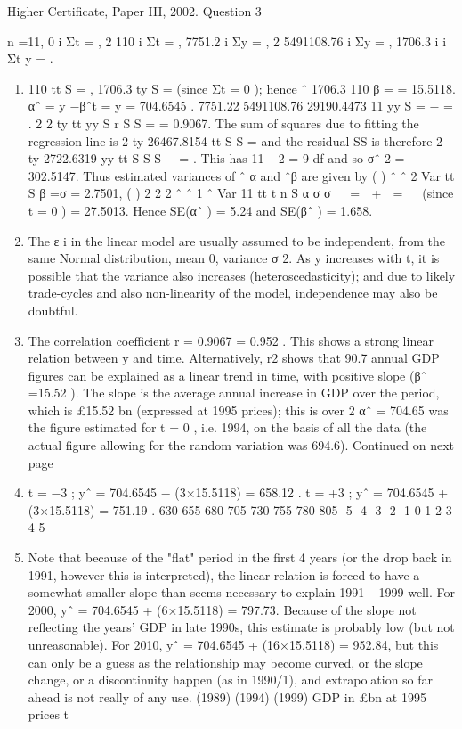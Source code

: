 \documentclass[a4paper,12pt]{article}
\begin{document}
Higher Certificate, Paper III, 2002. Question 3

n =11, 0 i Σt = , 2 110 i Σt = , 7751.2 i Σy = , 2 5491108.76 i Σy = , 1706.3 i i Σt y = .
\begin{enumerate} 
\item  110 tt S = , 1706.3 ty S = (since Σt = 0 ); hence ˆ 1706.3
110
β = = 15.5118.
αˆ = y −βˆt = y = 704.6545 .
7751.22 5491108.76 29190.4473
11 yy S = − = .
2
2 ty
tt yy
S
r
S S
= = 0.9067.
The sum of squares due to fitting the regression line is
2
ty 26467.8154
tt
S
S
= and the
residual SS is therefore
2
ty 2722.6319
yy
tt
S
S
S
− = .
This has 11 – 2 = 9 df and so σˆ 2 = 302.5147.
Thus estimated variances of ˆ α and ˆβ are given by
( ) ˆ ˆ 2 Var
tt S
β =σ = 2.7501, ( )
2 2
2 ˆ ˆ 1 ˆ Var
11 tt
t
n S
α σ σ
 
=  +  =
 
(since t = 0 ) = 27.5013.
Hence SE(αˆ ) = 5.24 and SE(βˆ ) = 1.658.
\item  The { ε
i} in the linear model are usually assumed to be independent, from the
same Normal distribution, mean 0, variance σ 2. As y increases with t, it is possible
that the variance also increases (heteroscedasticity); and due to likely trade-cycles
and also non-linearity of the model, independence may also be doubtful.
\item  The correlation coefficient r = 0.9067 = 0.952 . This shows a strong linear
relation between y and time. Alternatively, r2 shows that 90.7%
annual GDP figures can be explained as a linear trend in time, with positive slope
(βˆ =15.52 ). The slope is the average annual increase in GDP over the period, which
is £15.52 bn (expressed at 1995 prices); this is over 2%
αˆ = 704.65 was the figure estimated for t = 0 , i.e. 1994, on the basis of all the data
(the actual figure allowing for the random variation was 694.6).
Continued on next page
\item  t = −3 ; yˆ = 704.6545 − (3×15.5118) = 658.12 .
t = +3 ; yˆ = 704.6545 + (3×15.5118) = 751.19 .
630
655
680
705
730
755
780
805
-5 -4 -3 -2 -1 0 1 2 3 4 5
\item  Note that because of the "flat" period in the first 4 years (or the drop back in
1991, however this is interpreted), the linear relation is forced to have a somewhat
smaller slope than seems necessary to explain 1991 – 1999 well.
For 2000, yˆ = 704.6545 + (6×15.5118) = 797.73. Because of the slope not reflecting
the years' GDP in late 1990s, this estimate is probably low (but not unreasonable).
For 2010, yˆ = 704.6545 + (16×15.5118) = 952.84, but this can only be a guess as the
relationship may become curved, or the slope change, or a discontinuity happen (as in
1990/1), and extrapolation so far ahead is not really of any use.
(1989) (1994) (1999)
GDP in £bn at
1995 prices
t

\end{enumerate}
\end{document}
